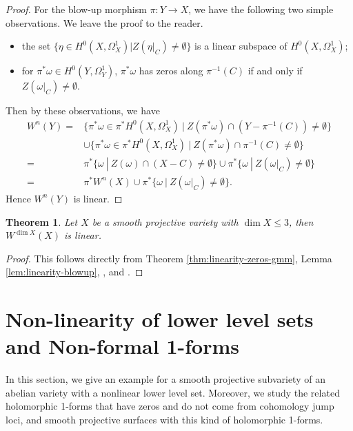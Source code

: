 \documentclass[a4paper,12pt,reqno]{amsart}
\newtheorem{theorem}{Theorem}[section]
\theoremstyle{question}
\theoremstyle{definition}
\theoremstyle{remark}
\theoremstyle{cited}
\theoremstyle{citeddef}
\begin{document}
\begin{proof}
  For the blow-up morphism $\pi\colon Y\to X$, we have the following two simple observations. We leave the proof to the reader. 
  \begin{itemize}
        \item[(a)] the set $\{\eta\in H^0(X, \Omega_X^1)|Z(\eta|_{C})\neq \emptyset\}$ is a linear subspace of $H^0(X, \Omega_X^1)$;
        \item[(b)] for $\pi^{\ast}\omega\in H^0(Y, \Omega_Y^1)$, $\pi^{\ast}\omega$ has zeros along $\pi^{-1}(C)$ if and only if  $Z(\omega|_C)\neq\emptyset$.
    \end{itemize} 
Then by these observations, we have  
\begin{align*}
W^n(Y) =&\{\pi^{\ast}\omega \in \pi^{\ast} H^0(X, \Omega_X^1)\ |\ Z(\pi^{\ast}\omega)\cap (Y-\pi^{-1}(C))\neq\emptyset\}\\
     &\cup \{\pi^{\ast}\omega \in \pi^{\ast} H^0(X, \Omega_X^1)\ |\ Z(\pi^{\ast}\omega)\cap \pi^{-1}(C)\neq\emptyset\} \\
     =& \pi^{\ast} \{\omega\ |\ Z(\omega)\cap (X-C)\neq\emptyset\}\cup  \pi^{\ast} \{\omega\ |\ Z(\omega|_C)\neq\emptyset\}  \\
     =& \pi^{\ast} W^n(X)\cup \pi^{\ast}\{\omega\ |\ Z(\omega|_C)\neq\emptyset\}.
\end{align*}
Hence $W^n(Y)$ is linear. 
\end{proof}




\begin{theorem}\label{prop:23linearity}
 Let $X$ be a smooth projective variety with $\dim X\leq 3$, then $W^{\dim X}(X)$ is linear.   
\end{theorem}

\begin{proof}
    This follows directly from Theorem \ref{thm:linearity-zeros-gmm}, Lemma \ref{lem:linearity-blowup}, \cite[Corollary 3.1]{Sch21}, and \cite[Theorem 1.3]{HS21}.
\end{proof}










\section{Non-linearity of lower level sets and Non-formal 1-forms}
In this section, we give an example for a smooth projective subvariety of an abelian variety with a nonlinear lower level set. Moreover, we study the related holomorphic 1-forms that have zeros and do not come from cohomology jump loci, and smooth projective surfaces with this kind of holomorphic 1-forms.
\end{document}
